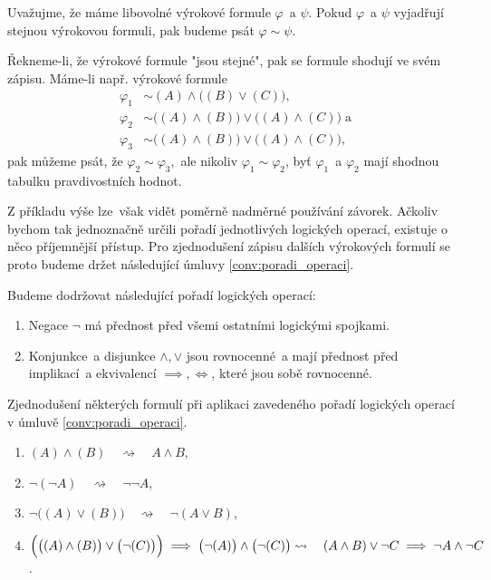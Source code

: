 \begin{convention}
    \label{conv:rovnost_logickych_formuli}
    Uvažujme, že máme libovolné výrokové formule $\varphi$~a $\psi$. Pokud $\varphi$~a $\psi$ vyjadřují stejnou výrokovou formuli, pak budeme psát $\varphi\sim\psi$.
\end{convention}
Řekneme-li, že výrokové formule "jsou stejné", pak se formule shodují ve svém zápisu. Máme-li např. výrokové formule
\begin{align*}
    \varphi_1&\sim (A) \land \bigl((B) \lor (C)\bigr),\\
    \varphi_2&\sim \bigl((A) \land (B)\bigr) \lor \bigl((A) \land (C)\big )\;\text{a}\\
    \varphi_3&\sim \bigl((A) \land (B)\bigr) \lor \bigl((A) \land (C)\bigr),
\end{align*}
pak můžeme psát, že $\varphi_2\sim\varphi_3$,~ale nikoliv $\varphi_1\sim\varphi_2$, byť $\varphi_1$~a $\varphi_2$ mají shodnou tabulku pravdivostních hodnot.\par
Z příkladu výše lze~však vidět poměrně nadměrné používání závorek. Ačkoliv bychom tak jednoznačně určili pořadí jednotlivých logických operací, existuje o něco příjemnější přístup. Pro zjednodušení zápisu dalších výrokových formulí se proto budeme držet následující úmluvy \ref{conv:poradi_operaci}.
\begin{convention}\label{conv:poradi_operaci}
    Budeme dodržovat následující pořadí logických operací:
    \begin{enumerate}[label=(\arabic*)]
        \item Negace $\neg$ má přednost před všemi ostatními logickými spojkami.
        \item Konjunkce~a disjunkce $\land,\lor$ jsou rovnocenné~a mají přednost před implikací~a ekvivalencí $\implies,\iff$, které jsou sobě rovnocenné.
    \end{enumerate}
\end{convention}
\begin{example}
    Zjednodušení některých formulí při aplikaci zavedeného pořadí logických operací v úmluvě \ref{conv:poradi_operaci}.
    \begin{enumerate}[label=(\roman*)]
        \item $(A) \land (B)\quad\rightsquigarrow\quad A \land B$,
        \item $\neg(\neg A)\quad\rightsquigarrow\quad \neg\neg A$,
        \item $\neg \bigl((A) \lor (B)\bigr)\quad \rightsquigarrow\quad \neg(A \lor B)$,
        \item $\Bigl(\bigl((A) \land (B)\bigr) \lor \bigl(\neg (C)\bigr)\Bigr) \implies \bigl(\neg (A)\bigr) \land \bigl(\neg (C)\bigr)\\ \rightsquigarrow\quad(A \land B) \lor \neg C \implies \neg A \land \neg C$.
    \end{enumerate}
\end{example}

